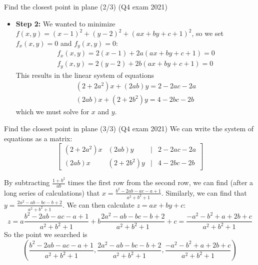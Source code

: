 \begin{frame}{Find the closest point in plane (2/3) (Q4 exam 2021)}

    \begin{itemize}
        \item\textbf{Step 2:}
            We wanted to minimize $f(x,y)=(x-1)^2+(y-2)^2+(ax+by+c+1)^2$, so we set $f_x(x,y)=0$ and $f_y(x,y)=0$:
            \begin{align*}
                f_x(x,y)=2(x-1)+2a(ax+by+c+1)=0\\
                f_y(x,y)=2(y-2)+2b(ax+by+c+1)=0
            \end{align*}\pause
            This results in the linear system of equations
            \begin{align*}
                (2+2a^2)x + (2ab)y = 2-2ac-2a\\
                (2ab)x+(2+2b^2)y = 4-2bc-2b
            \end{align*}
            which we must solve for $x$ and $y$.
    \end{itemize}


\end{frame}

\begin{frame}{Find the closest point in plane (3/3) (Q4 exam 2021)}
        We can write the system of equations as a matrix:
            \[\begin{bmatrix}
                (2+2a^2)x & (2ab)y &\mid& 2-2ac-2a\\
                (2ab)x & (2+2b^2)y &\mid& 4-2bc-2b
            \end{bmatrix}\]

            \pause By subtracting $\frac{1+b^2}{ab}$ times the first row from the second row, we can find (after a long series of calculations) that $x=\frac{b^2-2ab-ac-a+1}{a^2+b^2+1}$. \pause Similarly, we can find that $y=\frac{2a^2-ab-bc-b+2}{a^2+b^2+1}$. \pause We can then calculate $z=ax+by+c$:
            {\footnotesize \[z=a\frac{b^2-2ab-ac-a+1}{a^2+b^2+1}+b\frac{2a^2-ab-bc-b+2}{a^2+b^2+1}+c=\frac{-a^2-b^2+a+2b+c}{a^2+b^2+1}\]}
    \pause So the point we searched is
    \[\boxed{\left(\frac{b^2-2ab-ac-a+1}{a^2+b^2+1},\frac{2a^2-ab-bc-b+2}{a^2+b^2+1},\frac{-a^2-b^2+a+2b+c}{a^2+b^2+1}\right)}\]

\end{frame}
